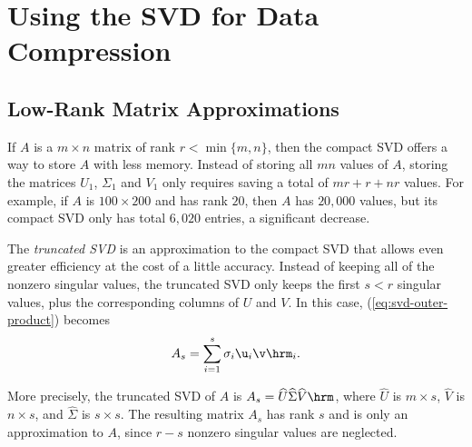\section*{Using the SVD for Data Compression} %

\subsection*{Low-Rank Matrix Approximations} %

If $A$ is a $m\times n$ matrix of rank $r < \min\{m,n\}$, then the compact SVD offers a way to store $A$ with less memory.
Instead of storing all $mn$ values of $A$, storing the matrices $U_1$, $\Sigma_1$ and $V_1$ only requires saving a total of $mr+r+nr$ values.
For example, if $A$ is $100 \times 200$ and has rank $20$, then $A$ has $20,000$ values, but its compact SVD only has total $6,020$ entries, a significant decrease.

The \emph{truncated SVD} is an approximation to the compact SVD that allows even greater efficiency at the cost of a little accuracy.
Instead of keeping all of the nonzero singular values, the truncated SVD only keeps the first $s < r$ singular values, plus the corresponding columns of $U$ and $V$.
In this case, (\ref{eq:svd-outer-product}) becomes
\begin{equation*}
A_s = \sum_{i=1}^s \sigma_i\u_i\v\hrm_i.
\end{equation*}

More precisely, the truncated SVD of $A$ is $A_s = \widehat{U}\widehat{\Sigma} \widehat{V}\hrm$, where
$\widehat{U}$ is $m\times s$, $\widehat{V}$ is $n \times s$, and $\widehat{\Sigma}$ is $s\times s$.
The resulting matrix $A_s$ has rank $s$ and is only an approximation to $A$, since $r - s$ nonzero singular values are neglected.

